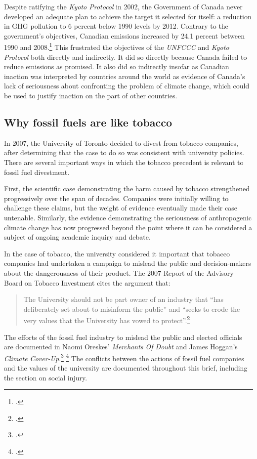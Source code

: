 Despite ratifying the \emph{Kyoto Protocol} in 2002, the Government of Canada never developed an adequate plan to achieve the target it selected for itself: a reduction in GHG pollution to 6 percent below 1990 levels by 2012.
Contrary to the government's objectives, Canadian emissions increased by 24.1 percent between 1990 and 2008.\footcite[][p. 3]{UNFCCCCanada2010}
This frustrated the objectives of the \emph{UNFCCC} and \emph{Kyoto Protocol} both directly and indirectly.
It did so directly because Canada failed to reduce emissions as promised.
It also did so indirectly insofar as Canadian inaction was interpreted by countries around the world as evidence of Canada's lack of seriousness about confronting the problem of climate change, which could be used to justify inaction on the part of other countries. 



	\subsection{Why fossil fuels are like tobacco}
	\label{sec:LikeTobacco}



In 2007, the University of Toronto decided to divest from tobacco companies, after determining that the case to do so was consistent with university policies.
There are several important ways in which the tobacco precedent is relevant to fossil fuel divestment.



First, the scientific case demonstrating the harm caused by tobacco strengthened progressively over the span of decades.
Companies were initially willing to challenge these claims, but the weight of evidence eventually made their case untenable.
Similarly, the evidence demonstrating the seriousness of anthropogenic climate change has now progressed beyond the point where it can be considered a subject of ongoing academic inquiry and debate.



In the case of tobacco, the university considered it important that tobacco companies had undertaken a campaign to mislead the public and decision-makers about the dangerousness of their product.
The 2007 Report of the Advisory Board on Tobacco Investment cites the argument that:
\begin{quote}
The University should not be part owner of an industry that ``has deliberately set about to misinform the public'' and ``seeks to erode the very values that the University has vowed to protect''.\footcite[][p. 5]{TobaccoReport_2007}
\end{quote}
The efforts of the fossil fuel industry to mislead the public and elected officials are documented in Naomi Oreskes' \emph{Merchants Of Doubt} and James Hoggan's \emph{Climate Cover-Up}.\footcite[][]{MerchantsDoubt} \footcite[][]{ClimateCoverUp}
The conflicts between the actions of fossil fuel companies and the values of the university are documented throughout this brief, including the section on social injury.



